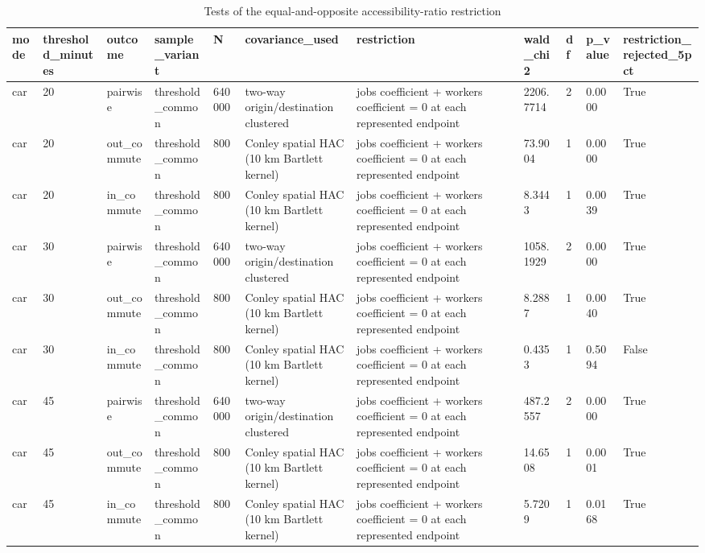 \begin{table}[htbp]
\centering
\scriptsize
\caption{Tests of the equal-and-opposite accessibility-ratio restriction}
\label{tab:ratio-test}
\begin{tabular}{lllllllllll}
\toprule
mode & threshold\_minutes & outcome & sample\_variant & N & covariance\_used & restriction & wald\_chi2 & df & p\_value & restriction\_rejected\_5pct \\
\midrule
car & 20 & pairwise & threshold\_common & 640000 & two-way origin/destination clustered & jobs coefficient + workers coefficient = 0 at each represented endpoint & 2206.7714 & 2 & 0.0000 & True \\
car & 20 & out\_commute & threshold\_common & 800 & Conley spatial HAC (10 km Bartlett kernel) & jobs coefficient + workers coefficient = 0 at each represented endpoint & 73.9004 & 1 & 0.0000 & True \\
car & 20 & in\_commute & threshold\_common & 800 & Conley spatial HAC (10 km Bartlett kernel) & jobs coefficient + workers coefficient = 0 at each represented endpoint & 8.3443 & 1 & 0.0039 & True \\
car & 30 & pairwise & threshold\_common & 640000 & two-way origin/destination clustered & jobs coefficient + workers coefficient = 0 at each represented endpoint & 1058.1929 & 2 & 0.0000 & True \\
car & 30 & out\_commute & threshold\_common & 800 & Conley spatial HAC (10 km Bartlett kernel) & jobs coefficient + workers coefficient = 0 at each represented endpoint & 8.2887 & 1 & 0.0040 & True \\
car & 30 & in\_commute & threshold\_common & 800 & Conley spatial HAC (10 km Bartlett kernel) & jobs coefficient + workers coefficient = 0 at each represented endpoint & 0.4353 & 1 & 0.5094 & False \\
car & 45 & pairwise & threshold\_common & 640000 & two-way origin/destination clustered & jobs coefficient + workers coefficient = 0 at each represented endpoint & 487.2557 & 2 & 0.0000 & True \\
car & 45 & out\_commute & threshold\_common & 800 & Conley spatial HAC (10 km Bartlett kernel) & jobs coefficient + workers coefficient = 0 at each represented endpoint & 14.6508 & 1 & 0.0001 & True \\
car & 45 & in\_commute & threshold\_common & 800 & Conley spatial HAC (10 km Bartlett kernel) & jobs coefficient + workers coefficient = 0 at each represented endpoint & 5.7209 & 1 & 0.0168 & True \\

\end{tabular}
\end{table}
